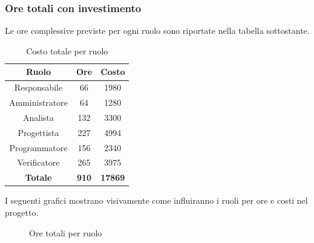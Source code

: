 \subsubsection{Ore totali con investimento}
Le ore complessive previste per ogni ruolo sono riportate nella tabella sottostante.
\begin{table}[H]
	\centering
	\begin{tabular}{|c|c|c|}
		\hline
		\textbf{Ruolo} &
		\textbf{Ore} &
		\textbf{Costo} \\
		\hline
		Responsabile & 66 & 1980\\
		\hline
		Amministratore & 64 & 1280\\
		\hline
		Analista & 132 & 3300\\
		\hline
		Progettista & 227 & 4994 \\
		\hline
		Programmatore & 156 & 2340 \\
		\hline
		Verificatore & 265 & 3975\\
		\hline
		\textbf{Totale} & \textbf{910} & \textbf{17869} \\
		\hline
	\end{tabular}
	\caption{Costo totale per ruolo}
\end{table}
I seguenti grafici mostrano visivamente come influiranno i ruoli per ore e costi nel progetto.
\begin{figure}[H]
	\centering
	\caption{Ore totali per ruolo}
\end{figure}
